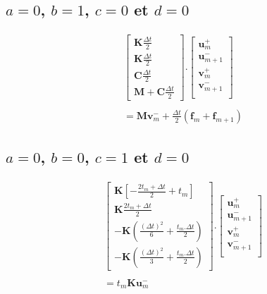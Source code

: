 \documentclass[12pt,a4paper]{report}
\begin{document}
\subsection{$a=0$, $b=1$, $c=0$ et $d=0$}
\begin{equation}
\begin{array}{l }
	\begin{bmatrix}	   
		   \mathbf{K} \frac{\Delta t}{2}
		\\   
		   \mathbf{K} \frac{\Delta t}{2} 
		\\   
		   \mathbf{C} \frac{\Delta t}{2}
		\\   
		   \mathbf{M} 
		   +\mathbf{C} \frac{\Delta t}{2}
	\end{bmatrix}
	.
	\begin{bmatrix}
		   \mathbf{u}_m^+  		\\
		   \mathbf{u}_{m+1}^-  	\\
		   \mathbf{v}_m^+  		\\
		   \mathbf{v}_{m+1}^-  	\\
	\end{bmatrix}
	\\
	\\
		= \mathbf{M} \mathbf{v}_m^-
	     +\frac{\Delta t}{2}  (\mathbf{f}_m + \mathbf{f}_{m+1})
	
\end{array}
\end{equation}

\subsection{$a=0$, $b=0$, $c=1$ et $d=0$}
\begin{equation}
\begin{array}{l }
	\begin{bmatrix}	   
		   \mathbf{K} \left[
			   - \frac{2t_m + \Delta t}{2} 
			   + t_m 
			\right]
		\\   
		   \mathbf{K}
			   		\frac{2t_m + \Delta t}{2}
		\\   
		   -\mathbf{K}
		   		(\frac{(\Delta t)^2}{6} + \frac{t_m.\Delta t}{2})
		\\
		   -\mathbf{K}
		   		(\frac{(\Delta t)^2}{3} + \frac{t_m.\Delta t}{2})
	\end{bmatrix}
	.
	\begin{bmatrix}
		   \mathbf{u}_m^+  		\\
		   \mathbf{u}_{m+1}^-  	\\
		   \mathbf{v}_m^+  		\\
		   \mathbf{v}_{m+1}^-  	\\
	\end{bmatrix}
	\\
	\\
		= t_m \mathbf{K} \mathbf{u}_m^-
	
\end{array}
\end{equation}
\end{document}
